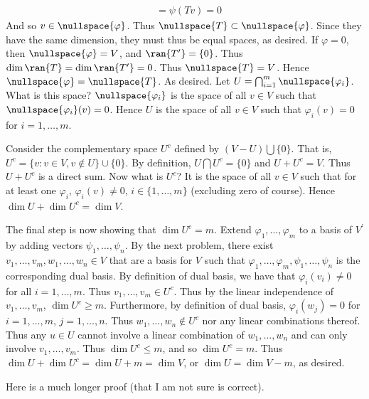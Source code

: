 \documentclass{book}
\begin{document}
\begin{enumerate}[label=\arabic*)]
\begin{align*}
        & = \psi(Tv) = 0
      \end{align*}
      And so $v \in \nullspace{\varphi}$. Thus $\nullspace{T} \subset \nullspace{\varphi}$. Since they have the same dimension, they must thus be equal spaces, as desired. If $\varphi = 0$, then
      $\nullspace{\varphi} = V$, and $\ran{T^{\prime}} = \{0\}$. Thus $\dim{\ran{T}} = \dim{\ran{T^{\prime}}} = 0$. Thus $\nullspace{T} = V$. Hence $\nullspace{\varphi} =
      \nullspace{T}$. As desired.
    \ii
      Let $U = \bigcap_{i = 1}^{m}\nullspace{\varphi_i}$. What is this space? $\nullspace{\varphi_i}$ is the space of all $v \in V$ such that $\nullspace{\varphi_i}(v)
      = 0$. Hence $U$ is the space of all $v \in V$ such that $\varphi_i(v) = 0$ for $i = 1, \dots, m$. 

      Consider the complementary space $U^c$ defined by $(V - U)\bigcup\{0\}$. That is, $U^c = \{v: v \in V, v\not\in U\}\cup\{0\}$. By definition, $U\bigcap U^c = \{0\}$ and $U + U^c = V$.
      Thus $U + U^c$ is a direct sum. Now what is $U^c$? It is the space of all $v \in V$ such that for at least one $\varphi_i$, $\varphi_i(v) \neq 0$, $i \in \{1, \dots, m\}$ (excluding
      zero of course). Hence $\dim{U} + \dim{U^c} = \dim{V}$. 

      The final step is now showing that $\dim{U^c} = m$. Extend $\varphi_1, \dots, \varphi_m$ to a basis of $V^{\prime}$ by adding vectors $\psi_1, \dots, \psi_n$. By the next problem,
      there exist $v_1, \dots, v_m, w_1, \dots, w_n \in V$ that are a basis for $V$ such that $\varphi_1, \dots, \varphi_m, \psi_1, \dots, \psi_n$ is the corresponding dual basis. By
      definition of dual basis, we have that $\varphi_i(v_i) \neq 0$ for all $i = 1, \dots, m$. Thus $v_1, \dots, v_m \in U^c$. Thus by the linear independence of $v_1, \dots, v_m$,
      $\dim{U^c} \geq m$. Furthermore, by definition of dual basis, $\varphi_i(w_j) = 0$ for $i = 1, \dots, m$, $j = 1, \dots, n$. Thus $w_1, \dots, w_n \not\in U^c$ nor any linear
      combinations thereof. Thus any $u \in U$ cannot involve a linear combination of $w_1, \dots, w_n$ and can only involve $v_1, \dots, v_m$. Thus $\dim{U^c} \leq m$, and so $\dim{U^c} =
      m$. Thus $\dim{U} + \dim{U^c} = \dim{U} + m = \dim{V}$, or $\dim{U} = \dim{V} - m$, as desired.

      Here is a much longer proof (that I am not sure is correct).


\end{enumerate}
\end{document}
